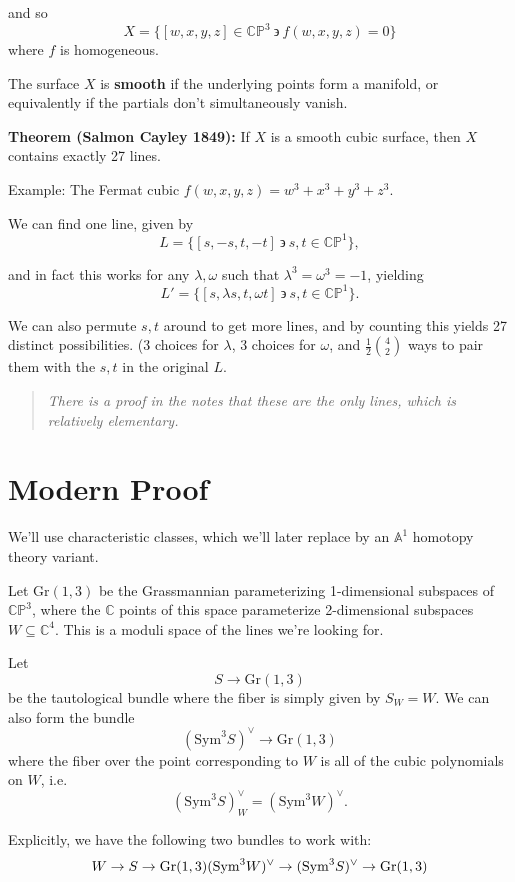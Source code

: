 \documentclass[11pt]{scrreprt}
\theoremstyle{definition}
\newcommand{\CC}[0]{{\mathbb{C}}}
\newcommand{\CP}[0]{{\mathbb{CP}}}
\newcommand{\Af}[0]{{\mathbb{A}}}
\newcommand{\Gr}[0]{{\text{Gr}}}
\newcommand{\dual}[0]{\vee}
\newcommand{\sym}[0]{\mathrm{Sym}}
\newcommand{\suchthat}[0]{{~\backepsilon ~}}
\newcommand{\theset}[1]{\{{#1}\}}
\begin{document}
and so \[
X = \theset{[w,x,y,z] \in \CP^3 \suchthat f(w,x,y,z) = 0}
\] where \(f\) is homogeneous.

The surface \(X\) is \textbf{smooth} if the underlying points form a
manifold, or equivalently if the partials don't simultaneously vanish.

\textbf{Theorem (Salmon Cayley 1849):} If \(X\) is a smooth cubic
surface, then \(X\) contains exactly 27 lines.

Example: The Fermat cubic \(f(w,x,y,z) = w^3 + x^3 + y^3 + z^3\).

We can find one line, given by \[
L = \theset{[s,-s,t,-t] \suchthat s,t \in \CP^1},
\]

and in fact this works for any \(\lambda, \omega\) such that
\(\lambda^3 = \omega^3 = -1\), yielding \[
L' = \theset{[s,\lambda s,t,\omega t] \suchthat s,t \in \CP^1}.
\]

We can also permute \(s,t\) around to get more lines, and by counting
this yields 27 distinct possibilities. (3 choices for \(\lambda\), 3
choices for \(\omega\), and \(\frac 1 2 {4\choose 2}\) ways to pair them
with the \(s,t\) in the original \(L\).

\begin{quote}\textit{
There is a proof in the notes that these are the only lines, which is
relatively elementary.
}\end{quote}

\hypertarget{modern-proof}{%
\section{Modern Proof}\label{modern-proof}}

We'll use characteristic classes, which we'll later replace by an
\(\Af^1\) homotopy theory variant.

Let \(\Gr(1,3)\) be the Grassmannian parameterizing 1-dimensional
subspaces of \(\CP^3\), where the \(\CC\) points of this space
parameterize 2-dimensional subspaces \(W \subseteq \CC^4\). This is a
moduli space of the lines we're looking for.

Let \[S \to \Gr(1,3)\] be the tautological bundle where the fiber is
simply given by \(S_W = W\). We can also form the bundle
\[(\sym^3 S)^\dual \to \Gr(1,3)\] where the fiber over the point
corresponding to \(W\) is all of the cubic polynomials on \(W\),
i.e.~\[(\sym^3 S)^\dual_W = (\sym^3 W)^\dual.\]

Explicitly, we have the following two bundles to work with: \[
W \to S \to \Gr(1,3) \\
(\sym^3 W)^\dual \to (\sym^3 S)^\dual \to \Gr(1,3)
\]
\end{document}
